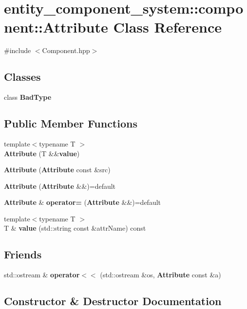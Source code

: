 \section{entity\+\_\+component\+\_\+system\+:\+:component\+:\+:Attribute Class Reference}
\label{classentity__component__system_1_1component_1_1_attribute}


{\ttfamily \#include $<$Component.\+hpp$>$}

\subsection*{Classes}
\begin{DoxyCompactItemize}
\item 
class {\bf Bad\+Type}
\end{DoxyCompactItemize}
\subsection*{Public Member Functions}
\begin{DoxyCompactItemize}
\item 
{\footnotesize template$<$typename T $>$ }\\{\bf Attribute} (T \&\&{\bf value})
\item 
{\bf Attribute} ({\bf Attribute} const \&src)
\item 
{\bf Attribute} ({\bf Attribute} \&\&)=default
\item 
{\bf Attribute} \& {\bf operator=} ({\bf Attribute} \&\&)=default
\item 
{\footnotesize template$<$typename T $>$ }\\T \& {\bf value} (std\+::string const \&attr\+Name) const
\end{DoxyCompactItemize}
\subsection*{Friends}
\begin{DoxyCompactItemize}
\item 
std\+::ostream \& {\bf operator$<$$<$} (std\+::ostream \&os, {\bf Attribute} const \&a)
\end{DoxyCompactItemize}


\subsection{Constructor \& Destructor Documentation}
\label{classentity__component__system_1_1component_1_1_attribute_ac1def21cbf2a5dc060adaa1d951e74de} 
